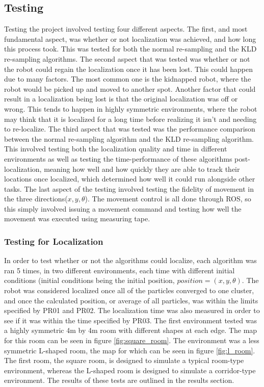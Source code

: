 \documentclass{article}
\newcommand\tab[1][0.5cm]{\hspace*{#1}}
\begin{document}
\subsection{Testing}
\tab Testing the project involved testing four different aspects. The first, and most fundamental aspect, was whether or not localization was achieved, and how long this process took. This was tested for both the normal re-sampling and the KLD re-sampling algorithms. The second aspect that was tested was whether or not the robot could regain the localization once it has been lost. This could happen due to many factors. The most common one is the kidnapped robot, where the robot would be picked up and moved to another spot. Another factor that could result in a localization being lost is that the original localization was off or wrong. This tends to happen in highly symmetric environments, where the robot may think that it is localized for a long time before realizing it isn't and needing to re-localize. The third aspect that was tested was the performance comparison between the normal re-sampling algorithm and the KLD re-sampling algorithm. This involved testing both the localization quality and time in different environments as well as testing the time-performance of these algorithms post-localization, meaning how well and how quickly they are able to track their locations once localized, which determined how well it could run alongside other tasks. The last aspect of the testing involved testing the fidelity of movement in the three directions($x, y, \theta$). The movement control is all done through ROS, so this simply involved issuing a movement command and testing how well the movement was executed using measuring tape.

\subsubsection{Testing for Localization}
\tab In order to test whether or not the algorithms could localize, each algorithm was ran 5 times, in two different environments, each time with different initial conditions (initial conditions being the initial position, $position = (x, y, \theta)$. The robot was considered localized once all of the particles converged to one cluster, and once the calculated position, or average of all particles, was within the limits specified by PR01 and PR02. The localization time was also measured in order to see if it was within the time specified by PR03. The first environment tested was a highly symmetric 4m by 4m room with different shapes at each edge. The map for this room can be seen in figure \ref{fig:square_room}. The environment was a less symmetric L-shaped room, the map for which can be seen in figure \ref{fig:l_room}. The first room, the square room, is designed to simulate a typical room-type environment, whereas the L-shaped room is designed to simulate a corridor-type environment. The results of these tests are outlined in the results section.
\end{document}
